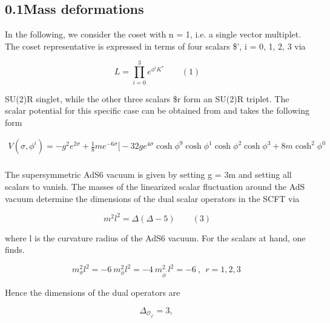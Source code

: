 \documentclass{article}
\begin{document}
\sloppy

\subsection*{0.1Mass deformations}


In the following, we consider the coset with n = 1, i.e. a single vector multiplet. The coset
representative is expressed in terms of four scalars \$', i = 0, 1, 2, 3 via


\begin{equation}
L = \prod _ { i = 0 } ^ { 3 } e ^ { \phi ^ { i } K ^ { * } } \qquad ( 1 )
\end{equation}


SU(2)R singlet, while the other three scalars \$r form an SU(2)R triplet. The scalar potential
for this specific case can be obtained from and takes the following form


\begin{equation}
\begin{array} { r } { V ( \sigma, \phi ^ { i } ) = - g ^ { 2 } e ^ { 2 \sigma } + \frac { 1 } { 8 } m e ^ { - 6 \sigma } \bigg [ - 3 2 g e ^ { 4 \sigma } \cosh \phi ^ { 9 } \cosh \phi ^ { 1 } \cosh \phi ^ { 2 } \cosh \phi ^ { 3 } + 8 m \cosh ^ { 2 } \phi ^ { 0 } } \\ { \qquad }\end{array}
\end{equation}


The supersymmetric AdS6 vacuum is given by setting g = 3m and setting all scalars to
vanish. The masses of the linearized scalar fluctuation around the AdS vacuum determine
the dimensions of the dual scalar operators in the SCFT via


\begin{equation}
m ^ { 2 } l ^ { 2 } = \Delta ( \Delta - 5 ) \qquad ( 3 )
\end{equation}


where l is the curvature radius of the AdS6 vacuum. For the scalars at hand, one finds.


\begin{equation}
m _ { \sigma } ^ { 2 } l ^ { 2 } = - 6 ~ m _ { \phi } ^ { 2 } l ^ { 2 } = - 4 ~ m _ { \phi ^ { \prime } } ^ { 2 } l ^ { 2 } = - 6 ~, ~ ~ r = 1, 2, 3 ~
\end{equation}


Hence the dimensions of the dual operators are


\begin{equation}
\Delta _ { \mathcal { O } _ { \varphi } } = 3, ~
\end{equation}
\end{document}
